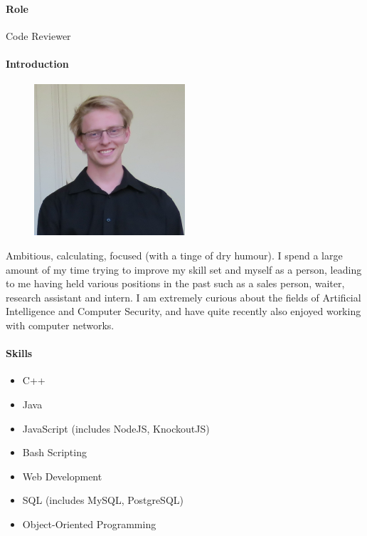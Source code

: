 \documentclass{article}
\begin{document}
        \paragraph{Role} Code Reviewer
        \paragraph{Introduction}
        \begin{figure}
            \begin{center}
            \vspace{-0.75cm}
            \includegraphics[width=0.5\textwidth]{img/andreas.jpg}
            \end{center}
        \end{figure}
        Ambitious, calculating, focused (with a tinge of dry humour). I spend a large amount of my time trying to improve my skill set and myself as a person, leading to me having held various positions in the past such as a sales person, waiter, research assistant and intern. I am extremely curious about the fields of Artificial Intelligence and Computer Security, and have quite recently also enjoyed working with computer networks.
        \paragraph{Skills}
            \begin{itemize}
                \item C++
                \item Java
                \item JavaScript (includes NodeJS, KnockoutJS)
                \item Bash Scripting
                \item Web Development
                \item SQL (includes MySQL, PostgreSQL)
                \item Object-Oriented Programming
            \end{itemize}
            
\end{document}
